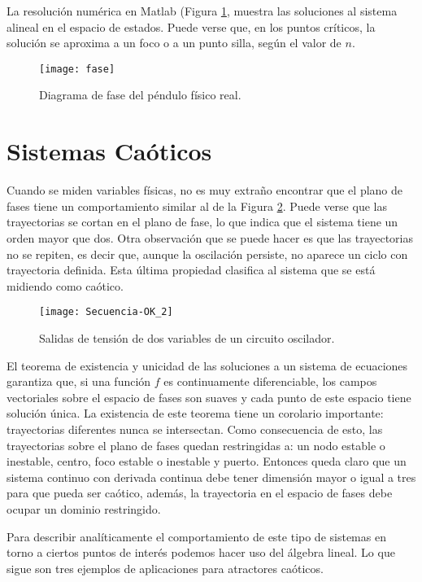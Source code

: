 La resolución numérica en Matlab (Figura \ref{fig:fase}, muestra las soluciones al sistema alineal en el espacio de estados.
Puede verse que, en los puntos críticos, la solución se aproxima a un foco o a un punto silla, según el valor de $n$.
%
\begin{figure}
\centering\texttt{[image: fase]}
\caption{Diagrama de fase del péndulo físico real.}
\label{fig:fase}
\end{figure}

\section{Sistemas Caóticos}
\label{secSistCaot}

Cuando se miden variables físicas, no es muy extraño encontrar que el plano de fases tiene un comportamiento similar al de la Figura \ref{fig:Secuencia-OK_2}.
Puede verse que las trayectorias se cortan en el plano de fase, lo que indica que el sistema tiene un orden mayor que dos.
Otra observación que se puede hacer es que las trayectorias no se repiten, es decir que, aunque la oscilación persiste, no aparece un ciclo con trayectoria definida.
Esta última propiedad clasifica al sistema que se está midiendo como caótico.

\begin{figure}
\centering\texttt{[image: Secuencia-OK\_2]}
\caption{Salidas de tensión de dos variables de un circuito oscilador.}
\label{fig:Secuencia-OK_2}
\end{figure}

El teorema de existencia y unicidad de las soluciones a un sistema de ecuaciones garantiza que, si una función $f$ es continuamente diferenciable, los campos vectoriales sobre el espacio de fases son suaves y cada punto de este espacio tiene solución única.
La existencia de este teorema tiene un corolario importante: trayectorias diferentes nunca se intersectan.
Como consecuencia de esto, las trayectorias sobre el plano de fases quedan restringidas a: un nodo estable o inestable, centro, foco estable o inestable y puerto.
Entonces queda claro que un sistema continuo con derivada continua debe tener dimensión mayor o igual a tres para que pueda ser caótico, además, la trayectoria en el espacio de fases debe ocupar un dominio restringido.

Para describir analíticamente el comportamiento de este tipo de sistemas en torno a ciertos puntos de interés podemos hacer uso del álgebra lineal.
Lo que sigue son tres ejemplos de aplicaciones para atractores caóticos.

